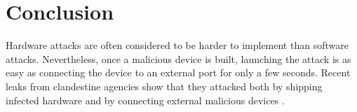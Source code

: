 

\section{Conclusion}

Hardware attacks are often considered to be harder to implement than software attacks. Nevertheless, once a malicious device is built, launching the attack is as easy as connecting the device to an external port for only a few seconds. Recent leaks from clandestine agencies show that they attacked both by shipping infected hardware \cite{Gal14} and by connecting external malicious devices \cite{Fin14}. 



